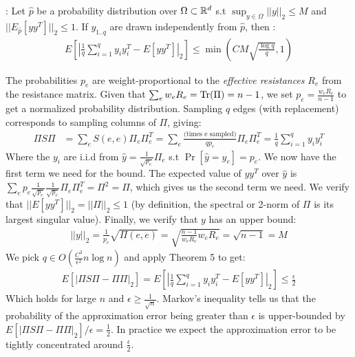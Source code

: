 \documentclass{article}
\begin{document}
\noindent
{}: Let $\hat{p}$ be a probability
distribution over $\Omega \subset \mathbb{R}^d$ s.t $\sup_{y \in \Omega} ||y||_2
\leq M$ and $||E_{\hat{p}}[yy^T]||_2 \leq 1$. If $y_{1..q}$ are drawn
independently from $\hat{p}$, then \cite{TheSurvey}
\cite{SpielmanSrivastava} \cite{RudelsonVershynin}:
\begin{align*}
    E\left[\left| \frac{1}{q} \sum^q_{i=1} y_iy^T_i - E[yy^T] \right|_2
    \right] \leq \min\left(CM\sqrt{\frac{\log q}{q}}, 1\right)
\end{align*}

The probabilities $p_e$ are weight-proportional to the \textit{effective
resistances} $R_e$ from the resistance matrix. Given that $\sum_e w_eR_e =
\text{Tr}(\Pi) = n - 1$, we set $p_e = \frac{w_eR_e}{n - 1}$ to get a normalized
probability distribution. Sampling $q$ edges (with replacement) corresponds
to sampling columns of $\Pi$, giving:
\begin{align*}
    \Pi S\Pi &= \sum_e S(e, e)\Pi_e\Pi^T_e
             = \sum_e \frac{\text{(times e sampled)}}{qp_e}\Pi_e\Pi^T_e
             = \frac{1}{q}\sum_{i=1}^q y_iy^T_i
\end{align*}
Where the $y_i$ are i.i.d from $\hat{y} = \frac{1}{\sqrt{p_e}}\Pi_e$ s.t
$\Pr[\hat{y} = y_e] = p_e$. We now have the first term we need for the
bound. The expected value of $yy^T$ over $\hat{y}$ is $\sum_e
p_e\frac{1}{\sqrt{p_e}}\frac{1}{\sqrt{p_e}}\Pi_e\Pi^T_e = \Pi^2 = \Pi$,
which gives us the second term we need. We verify that $||E[yy^T]||_2 =
||\Pi||_2 \leq 1$ (by definition, the spectral or 2-norm of $\Pi$ is its
largest singular value). Finally, we verify that $y$ has an upper bound:
\begin{align*}
    ||y||_2 = \frac{1}{p_e}\sqrt{\Pi(e, e)} = \sqrt{\frac{n -
    1}{w_eR_e}w_eR_e} = \sqrt{n-1} = M
\end{align*}
We pick $q \in O(\frac{C^2}{\epsilon^2}n\log n)$ and apply Theorem 5 to get:
\begin{align*}
    E[|\Pi S \Pi - \Pi\Pi|_2] =
    E\left[\left| \frac{1}{q} \sum^q_{i=1} y_iy^T_i - E[yy^T] \right|_2
    \right] \leq \frac{\epsilon}{2}
\end{align*}
Which holds for large $n$ and $\epsilon \geq \frac{1}{\sqrt{n}}$. Markov's
inequality tells us that the probability of the approximation error being
greater than $\epsilon$ is upper-bounded by $E[|\Pi S \Pi -
\Pi\Pi|_2]/\epsilon = \frac{1}{2}$. In practice we expect the approximation
error to be tightly concentrated around $\frac{\epsilon}{2}$.
\end{document}
